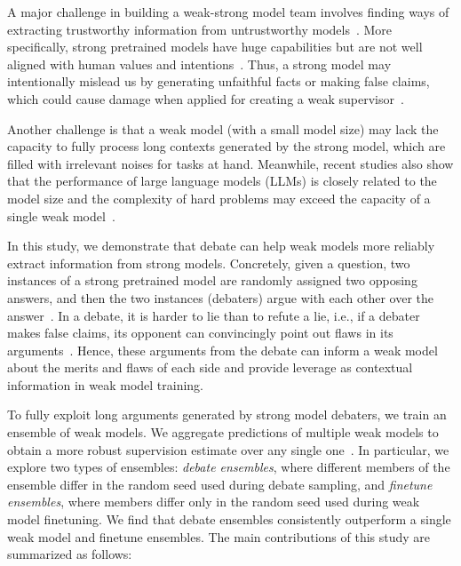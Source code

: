 \documentclass[letterpaper]{article} %
\begin{document}
A major challenge in building a weak-strong model team involves finding ways of extracting trustworthy information from untrustworthy models~\cite{bowman2022measuring}.
More specifically, strong pretrained models have huge capabilities but are not well aligned with human values and intentions~\cite{leike2018scalable,ji2023ai}.
Thus, a strong model may intentionally mislead us by generating unfaithful facts or making false claims, which could cause damage when applied for creating a weak supervisor~\cite{michael2023debate}.

Another challenge is that a weak model (with a small model size) may lack the capacity to fully process long contexts generated by the strong model, which are filled with irrelevant noises for tasks at hand.
Meanwhile, recent studies also show that the performance of large language models (LLMs) is closely related to the model size and the complexity of hard problems may exceed the capacity of a single weak model~\cite{xu2023retrieval,chung2024scaling}.

In this study, we demonstrate that debate can help weak models more reliably extract information from strong models.
Concretely, given a question, two instances of a strong pretrained model are randomly assigned two opposing answers, and then the two instances (debaters) argue with each other over the answer~\cite{michael2023debate,khan2024debating,kenton2024scalable}.
In a debate, it is harder to lie than to refute a lie, i.e., if a debater makes false claims, its opponent can convincingly point out flaws in its arguments~\cite{irving2018ai}.
Hence, these arguments from the debate can inform a weak model about the merits and flaws of each side and provide leverage as contextual information in weak model training.

To fully exploit long arguments generated by strong model debaters, we train an ensemble of weak models.
We aggregate predictions of multiple weak models to obtain a more robust supervision estimate over any single one~\cite{ganaie2022ensemble}.
In particular, we explore two types of ensembles: \textit{debate ensembles}, where different members of the ensemble differ in the random seed used during debate sampling, and \textit{finetune ensembles}, where members differ only in the random seed used during weak model finetuning.
We find that debate ensembles consistently outperform a single weak model and finetune ensembles.
The main contributions of this study are summarized as follows:
\end{document}
